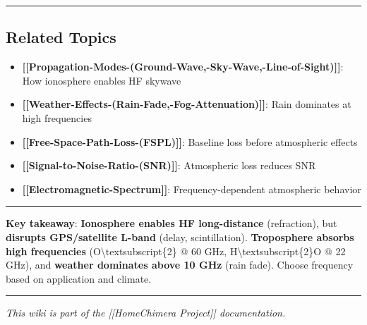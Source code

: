 \begin{center}\rule{0.5\linewidth}{0.5pt}\end{center}

\subsection{Related Topics}\label{related-topics}

\begin{itemize}
\tightlist
\item
  \textbf{{[}{[}Propagation-Modes-(Ground-Wave,-Sky-Wave,-Line-of-Sight){]}{]}}:
  How ionosphere enables HF skywave
\item
  \textbf{{[}{[}Weather-Effects-(Rain-Fade,-Fog-Attenuation){]}{]}}:
  Rain dominates at high frequencies
\item
  \textbf{{[}{[}Free-Space-Path-Loss-(FSPL){]}{]}}: Baseline loss before
  atmospheric effects
\item
  \textbf{{[}{[}Signal-to-Noise-Ratio-(SNR){]}{]}}: Atmospheric loss
  reduces SNR
\item
  \textbf{{[}{[}Electromagnetic-Spectrum{]}{]}}: Frequency-dependent
  atmospheric behavior
\end{itemize}

\begin{center}\rule{0.5\linewidth}{0.5pt}\end{center}

\textbf{Key takeaway}: \textbf{Ionosphere enables HF long-distance}
(refraction), but \textbf{disrupts GPS/satellite L-band} (delay,
scintillation). \textbf{Troposphere absorbs high frequencies}
(O\textbackslash textsubscript\{2\} @ 60 GHz,
H\textbackslash textsubscript\{2\}O @ 22 GHz), and \textbf{weather
dominates above 10 GHz} (rain fade). Choose frequency based on
application and climate.

\begin{center}\rule{0.5\linewidth}{0.5pt}\end{center}

\emph{This wiki is part of the {[}{[}Home\textbar Chimera Project{]}{]}
documentation.}
